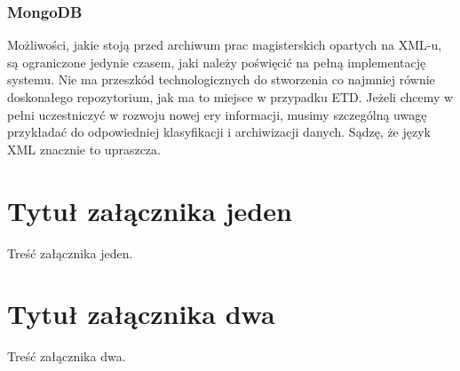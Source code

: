 \documentclass[brudnopis]{xmgr}
\begin{document}
\subsection{MongoDB}

\summary
Możliwości, jakie stoją przed archiwum prac magisterskich opartych na
XML-u, są ograniczone jedynie czasem, jaki należy poświęcić na pełną
implementację systemu. Nie ma przeszkód technologicznych do stworzenia
co najmniej równie doskonałego repozytorium, jak ma to miejsce w
przypadku ETD. Jeżeli chcemy w pełni uczestniczyć w rozwoju nowej ery
informacji, musimy szczególną uwagę przykładać do odpowiedniej
klasyfikacji i archiwizacji danych. Sądzę, że język XML znacznie to
upraszcza.

\appendix
\chapter{Tytuł załącznika jeden}

Treść załącznika jeden.

\chapter{Tytuł załącznika dwa}

Treść załącznika dwa.




\listoftables

\listoffigures

\oswiadczenie
\end{document}
